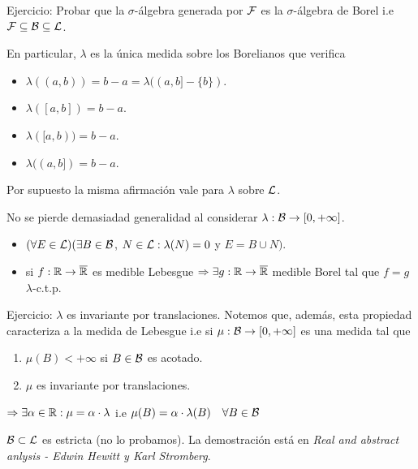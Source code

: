 Ejercicio: Probar que la \(\sigma\)-álgebra generada por \(\mathcal{F}\) es la \(\sigma\)-álgebra de Borel i.e \(\mathcal{F} \subseteq \mathcal{B} \subseteq \mathcal{L}\).

En particular, \(\lambda\) es la única medida sobre los Borelianos que verifica \begin{itemize}
    \item \(\lambda((a, b)) = b - a = \lambda((a, b] - \{ b \})\).
    \item \(\lambda([a, b]) = b - a\).
    \item \(\lambda([a, b)) = b - a\).
    \item \(\lambda((a, b]) = b - a\).
\end{itemize}

Por supuesto la misma afirmación vale para \(\lambda\) sobre \(\mathcal{L}\).

\begin{note}
    No se pierde demasiadad generalidad al considerar \(\lambda : \mathcal{B} \to [0, +\infty]\).
    \begin{itemize}
        \item \((\forall E \in \mathcal{L}) (\exists B \in \mathcal{B}\), \(N \in \mathcal{L} : \lambda(N) = 0\) y \(E = B \cup N)\).
        \item si \(f : \mathbb{R} \to \overline{\mathbb{R}}\) es medible Lebesgue \(\Rightarrow \exists g : \mathbb{R} \to \overline{\mathbb{R}}\) medible Borel tal que \( f = g\) \(\lambda\)-c.t.p.
    \end{itemize}
\end{note}

Ejercicio: \(\lambda\) es invariante por translaciones. Notemos que, además, esta propiedad caracteriza a la medida de Lebesgue i.e si \(\mu : \mathcal{B} \to [0, +\infty]\) es una medida tal que \begin{enumerate}
    \item \(\mu(B) < +\infty\) si \(B \in \mathcal{B}\) es acotado.
    \item \(\mu\) es invariante por translaciones.
\end{enumerate}
\(\Rightarrow \exists \alpha \in \mathbb{R} : \mu = \alpha \cdot \lambda\) i.e \(\mu(B) = \alpha \cdot \lambda(B) \quad \forall B \in \mathcal{B}\)

\begin{note}
    \(\mathcal{B} \subset \mathcal{L}\) es estricta (no lo probamos).
    La demostración está en \textit{Real and abstract anlysis - Edwin Hewitt y Karl Stromberg}.
\end{note}
